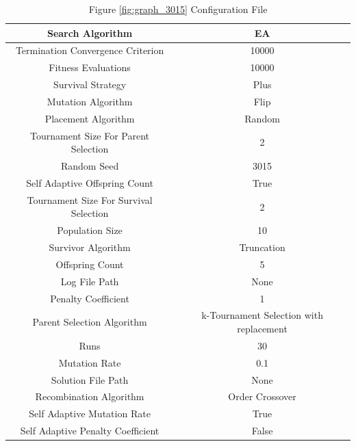 \documentclass{standalone}
\begin{document}
\begin{table}[!htb]
	\centering
	\caption{Figure \ref{fig:graph_3015} Configuration File}
	\label{tab:graph_3015}
	\begin{tabular}{| c | c |}
		\hline
		Search Algorithm		& EA		 \\
		\hline
		Termination Convergence Criterion		& 10000		 \\
		\hline
		Fitness Evaluations		& 10000		 \\
		\hline
		Survival Strategy		& Plus		 \\
		\hline
		Mutation Algorithm		& Flip		 \\
		\hline
		Placement Algorithm		& Random		 \\
		\hline
		Tournament Size For Parent Selection		& 2		 \\
		\hline
		Random Seed		& 3015		 \\
		\hline
		Self Adaptive Offspring Count		& True		 \\
		\hline
		Tournament Size For Survival Selection		& 2		 \\
		\hline
		Population Size		& 10		 \\
		\hline
		Survivor Algorithm		& Truncation		 \\
		\hline
		Offspring Count		& 5		 \\
		\hline
		Log File Path		& None		 \\
		\hline
		Penalty Coefficient		& 1		 \\
		\hline
		Parent Selection Algorithm		& k-Tournament Selection with replacement		 \\
		\hline
		Runs		& 30		 \\
		\hline
		Mutation Rate		& 0.1		 \\
		\hline
		Solution File Path		& None		 \\
		\hline
		Recombination Algorithm		& Order Crossover		 \\
		\hline
		Self Adaptive Mutation Rate		& True		 \\
		\hline
		Self Adaptive Penalty Coefficient		& False		 \\
		\hline
	\end{tabular}
\end{table}
\end{document}
